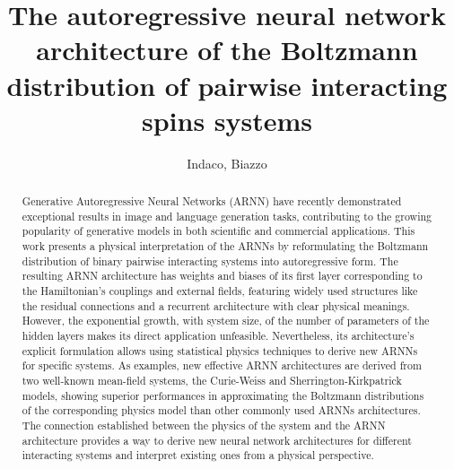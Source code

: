 \documentclass[aps,physrev,10pt,floatfix,reprint]{revtex4-2}
\begin{document}
\title{The autoregressive neural network architecture of the Boltzmann distribution of pairwise interacting spins systems}
\author{Indaco, Biazzo}

\begin{abstract}
    Generative Autoregressive Neural Networks (ARNN) have recently demonstrated exceptional results in image and language generation tasks, contributing to the growing popularity of generative models in both scientific and commercial applications. This work presents a physical interpretation of the ARNNs by reformulating the Boltzmann distribution of binary pairwise interacting systems into autoregressive form. The resulting ARNN architecture has weights and biases of its first layer corresponding to the Hamiltonian's couplings and external fields, featuring widely used structures like the residual connections and a recurrent architecture with clear physical meanings. However, the exponential growth, with system size, of the number of parameters of the hidden layers makes its direct application unfeasible. Nevertheless, its architecture's explicit formulation allows using statistical physics techniques to derive new ARNNs for specific systems. As examples, new effective ARNN architectures are derived from two well-known mean-field systems, the Curie-Weiss and Sherrington-Kirkpatrick models, showing superior performances in approximating the Boltzmann distributions of the corresponding physics model than other commonly used ARNNs architectures. The connection established between the physics of the system and the ARNN architecture provides a way to derive new neural network architectures for different interacting systems and interpret existing ones from a physical perspective.
\end{abstract}
    
    
\maketitle
\tableofcontents
\end{document}
